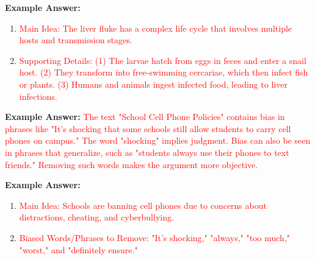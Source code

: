 \documentclass[12pt]{article}
\begin{document}
\begin{tcolorbox}[colframe=black!60, colback=white, coltitle=black, colbacktitle=black!15, fonttitle=\bfseries\Large, title=Guided Practice: Analyzing The Life Cycle of the Liver Fluke, halign title=center]
\textbf{Example Answer:}
\begin{enumerate}
    \item \textcolor{red}{Main Idea: The liver fluke has a complex life cycle that involves multiple hosts and transmission stages.}
    \item \textcolor{red}{Supporting Details: (1) The larvae hatch from eggs in feces and enter a snail host. (2) They transform into free-swimming cercariae, which then infect fish or plants. (3) Humans and animals ingest infected food, leading to liver infections.}
\end{enumerate}
\end{tcolorbox}

\begin{tcolorbox}[colframe=black!60, colback=white, coltitle=black, colbacktitle=black!15, fonttitle=\bfseries\Large, title=Example: Identifying Bias in Writing, halign title=center]
\textbf{Example Answer:}
\textcolor{red}{The text "School Cell Phone Policies" contains bias in phrases like "It's shocking that some schools still allow students to carry cell phones on campus." The word "shocking" implies judgment. Bias can also be seen in phrases that generalize, such as "students always use their phones to text friends." Removing such words makes the argument more objective.}
\end{tcolorbox}

\begin{tcolorbox}[colframe=black!60, colback=white, coltitle=black, colbacktitle=black!15, fonttitle=\bfseries\Large, title=Guided Practice: Identifying Bias in School Cell Phone Policies, halign title=center]
\textbf{Example Answer:}
\begin{enumerate}
    \item \textcolor{red}{Main Idea: Schools are banning cell phones due to concerns about distractions, cheating, and cyberbullying.}
    \item \textcolor{red}{Biased Words/Phrases to Remove: "It's shocking," "always," "too much," "worst," and "definitely ensure."}
\end{enumerate}
\end{tcolorbox}
\end{document}
